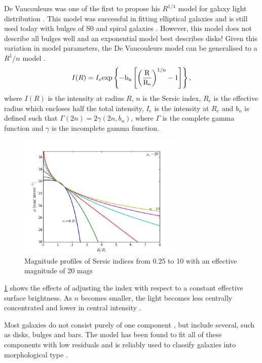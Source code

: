 De Vaucouleurs was one of the first to propose his $R^{1/4}$ model for galaxy light distribution \citep{de_vaucouleurs_revised_1963}. This model was successful in fitting elliptical galaxies and is still used today with bulges of S0 and spiral galaxies \citep{allen_millennium_2006}. However, this model does not describe all bulges well and an exponential model best describes disks! Given this variation in model parameters, the De Vaucouleurs model can be generalised to a \sersic $R^1/n$ model \citep{sersic_atlas_1968}.
\begin{equation}
		I(R) = I_{e} \rm{exp}\left\{-b_{n}\left[\left(\frac{R}{R_{e}}\right)^{1/n} - 1\right]\right\},
\end{equation}
where $I(R)$ is the intensity at radius $R$, $n$ is the Sersic index, $R_e$ is the effective radius which encloses half the total intensity, $I_e$ is the intensity at $R_e$ and $b_n$ is defined such that $\Gamma(2n) = 2\gamma(2n, b_n)$, where $\Gamma$ is the complete gamma function and $\gamma$ is the incomplete gamma function.
\begin{figure}[!ht]
		\centering
		\includegraphics[width=0.7\textwidth]{figs/sersic_mags.png}
		\caption{Magnitude profiles of Sersic indices from 0.25 to 10 with an effective magnitude of 20 mags}
		\label{fig:sersic_mags}
	\end{figure}
\ref{fig:sersic_mags} shows the effects of adjusting the \sersic index with respect to a constant effective surface brightness. As $n$ becomes smaller, the light becomes less centrally concentrated and lower in central intensity \citep{graham_concise_2005}. 

Most galaxies do not consist purely of one component \citep{laurikainen_multicomponent_2005}, but include several, such as disks, bulges and bars. The \sersic model has been found to fit all of these components with low residuals and is reliably used to classify galaxies into morphological type \citep{peng_detailed_2010}.


